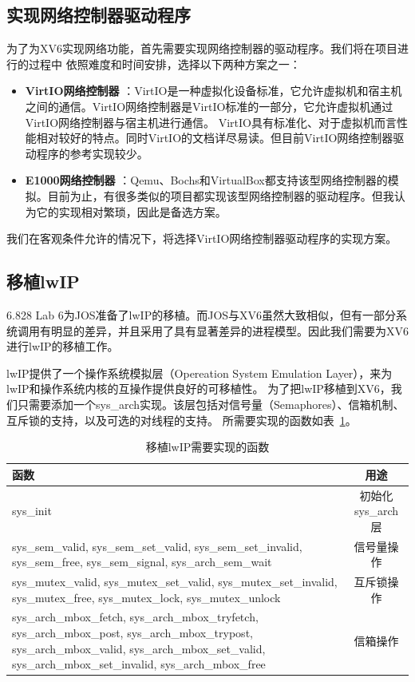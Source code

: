 \documentclass[a4paper,twoside]{article}
\begin{document}
\begin{spacing}{1.2}
\subsection{实现网络控制器驱动程序}

为了为XV6实现网络功能，首先需要实现网络控制器的驱动程序。我们将在项目进行的过程中
依照难度和时间安排，选择以下两种方案之一：

\begin{itemize}
	\item \textbf{VirtIO网络控制器 }：VirtIO\cite{russell2008virtio}是一种虚拟化设备标准，它允许虚拟机和宿主机之间的通信。VirtIO网络控制器是VirtIO标准的一部分，它允许虚拟机通过VirtIO网络控制器与宿主机进行通信。
	VirtIO具有标准化、对于虚拟机而言性能相对较好的特点。同时VirtIO的文档详尽易读。但目前VirtIO网络控制器驱动程序的参考实现较少。
	\item \textbf{E1000网络控制器 }：Qemu、Bochs和VirtualBox都支持该型网络控制器的模拟。目前为止，有很多类似的项目都实现该型网络控制器的驱动程序。但我认为它的实现相对繁琐，因此是备选方案。
\end{itemize}

我们在客观条件允许的情况下，将选择VirtIO网络控制器驱动程序的实现方案。

\subsection{移植lwIP}

6.828 Lab 6为JOS准备了lwIP的移植。而JOS与XV6虽然大致相似，但有一部分系统调用有明显的差异，并且采用了具有显著差异的进程模型。因此我们需要为XV6
进行lwIP的移植工作。

lwIP提供了一个操作系统模拟层（Opereation System Emulation Layer），来为lwIP和操作系统内核的互操作提供良好的可移植性。
为了把lwIP移植到XV6，我们只需要添加一个sys\_arch实现。该层包括对信号量（Semaphores）、信箱机制、互斥锁的支持，以及可选的对线程的支持。
所需要实现的函数如表~\ref{tbl:lwip}。

\begin{table}[htb]
	\centering
	\caption{移植lwIP需要实现的函数}
	\label{tbl:lwip}
	\begin{tabular}{p{4cm}|c}
		\toprule
		\hline
		函数 & 用途 \\
		\hline
		sys\_init & 初始化sys\_arch层 \\
		\hline
		sys\_sem\_valid, sys\_sem\_set\_valid, sys\_sem\_set\_invalid, sys\_sem\_free, sys\_sem\_signal, sys\_arch\_sem\_wait & 信号量操作 \\
		\hline 
		sys\_mutex\_valid, sys\_mutex\_set\_valid, sys\_mutex\_set\_invalid, sys\_mutex\_free, sys\_mutex\_lock, sys\_mutex\_unlock & 互斥锁操作 \\
		\hline
		sys\_arch\_mbox\_fetch, sys\_arch\_mbox\_tryfetch, sys\_arch\_mbox\_post, sys\_arch\_mbox\_trypost, sys\_arch\_mbox\_valid, sys\_arch\_mbox\_set\_valid, sys\_arch\_mbox\_set\_invalid, sys\_arch\_mbox\_free & 信箱操作 \\
		\hline
		\bottomrule


\end{tabular}
\end{table}
\end{spacing}
\end{document}
